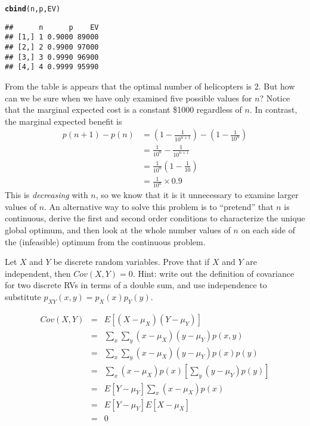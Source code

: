 \documentclass[addpoints,12pt]{exam}\usepackage[]{graphicx}\usepackage[]{color}
\makeatletter
\newcommand{\hlstd}[1]{\textcolor[rgb]{0.345,0.345,0.345}{#1}}%
\newcommand{\hlkwd}[1]{\textcolor[rgb]{0.737,0.353,0.396}{\textbf{#1}}}%
\newenvironment{kframe}{%
 \def\at@end@of@kframe{}%
 \ifinner\ifhmode%
  \def\at@end@of@kframe{\end{minipage}}%
  \begin{minipage}{\columnwidth}%
 \fi\fi%
 \def\FrameCommand##1{\hskip\@totalleftmargin \hskip-\fboxsep
 \colorbox{shadecolor}{##1}\hskip-\fboxsep
     \hskip-\linewidth \hskip-\@totalleftmargin \hskip\columnwidth}%
 \MakeFramed {\advance\hsize-\width
   \@totalleftmargin\z@ \linewidth\hsize
   \@setminipage}}%
 {\par\unskip\endMakeFramed%
 \at@end@of@kframe}
\newenvironment{knitrout}{}{} %
\makeatother
\begin{document}
\begin{questions}
\begin{solution}
\begin{knitrout}
\begin{kframe}
\begin{alltt}
\hlkwd{cbind}\hlstd{(n,p,EV)}
\end{alltt}
\begin{verbatim}
##      n      p    EV
## [1,] 1 0.9000 89000
## [2,] 2 0.9900 97000
## [3,] 3 0.9990 96900
## [4,] 4 0.9999 95990
\end{verbatim}
\end{kframe}
\end{knitrout}
From the table is appears that the optimal number of helicopters is $2$.
But how can we be sure when we have only examined five possible values for $n$?
Notice that the marginal expected cost is a constant \$1000 regardless of $n$.
In contrast, the marginal expected benefit is
\begin{align*}
  p(n+1) - p(n) &= \left( 1 - \frac{1}{10^{n+1}} \right) - \left( 1 - \frac{1}{10^{n}} \right) \\
  &= \frac{1}{10^{n}} - \frac{1}{10^{n+1}}\\
  &= \frac{1}{10^{n}}\left(1 - \frac{1}{10} \right) \\
  &= \frac{1}{10^n} \times 0.9
\end{align*}
This is \emph{decreasing} with $n$, so we know that it is it unnecessary to examine larger values of $n$.
An alternative way to solve this problem is to ``pretend'' that $n$ is continuous, derive the first and second order conditions to characterize the unique global optimum, and then look at the whole number values of $n$ on each side of the (infeasible) optimum from the continuous problem.

  \end{solution}



\question Let $X$ and $Y$ be discrete random variables.
Prove that if $X$ and $Y$ are independent, then $Cov(X,Y) = 0$. 
Hint: write out the definition of covariance for two discrete RVs in terms of a double sum, and use independence to substitute $p_{XY}(x,y) = p_X(x)p_Y(y)$.
\begin{solution}
\begin{eqnarray*}
	Cov(X,Y) &=& E[(X-\mu_X)(Y-\mu_Y)]\\
	&=& \sum_x \sum_y (x - \mu_X)(y- \mu_Y)p(x,y)\\
	&=&\sum_x \sum_y (x - \mu_X)(y- \mu_Y)p(x)p(y) \\
	&=& \sum_x  (x - \mu_X)p(x)\left[ \sum_y (y- \mu_Y)p(y)\right] \\
	&=& E[Y- \mu_Y] \sum_x  (x - \mu_X)p(x)\\
	&=& E[Y- \mu_Y]E[X- \mu_X] \\
	&=& 0
\end{eqnarray*}
\end{solution}


\end{questions}
\end{document}
